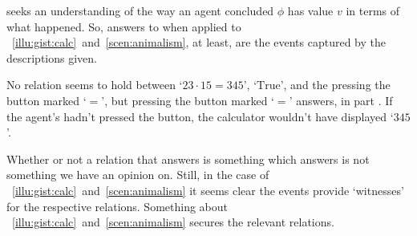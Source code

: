 \begin{note}
  \qHow{} seeks an understanding of the way an agent concluded \(\phi\) has value \(v\) in terms of what happened.
  So, answers to \qHow{} when applied to ~\ref{illu:gist:calc}~and~\ref{scen:animalism}, at least, are the events captured by the descriptions given.

  No relation seems to hold between `\(23 \cdot 15 = 345\)', `\(\text{True}\)', and the pressing the button marked `\(=\)', but pressing the button marked `\(=\)' answers, in part \qHow{}.
  If the agent's hadn't pressed the button, the calculator wouldn't have displayed `\(345\)'.

  Whether or not a relation that answers \qWhy{} is something which answers \qHow{} is not something we have an opinion on.
  Still, in the case of ~\ref{illu:gist:calc}~and~\ref{scen:animalism} it seems clear the events provide `witnesses' for the respective relations.
  Something about ~\ref{illu:gist:calc}~and~\ref{scen:animalism} secures the relevant relations.
\end{note}

